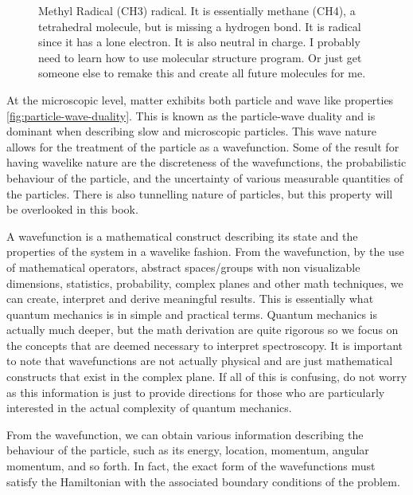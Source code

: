 \documentclass[11pt,a4paper]{book}
\newcommand{\imginput}[1]{} %
\begin{document}
	\begin{figure} [!ht]
		\centering
		\Large
		\def\svgwidth{\columnwidth}
		\resizebox{12cm}{!}{\imginput{images/methyl-radical.pdf_tex}}
		\caption{{Methyl Radical (CH3) radical. It is essentially methane (CH4), a tetrahedral molecule, but is missing a hydrogen bond. It is radical since it has a lone electron. It is also neutral in charge. I probably need to learn how to use molecular structure program. Or just get someone else to remake this and create all future molecules for me.}}
		\label{fig:methyl-radical}
	\end{figure}
		
	At the microscopic level, matter exhibits both particle and wave like properties \autoref{fig:particle-wave-duality}. This is known as the particle-wave duality and is dominant when describing slow and microscopic particles. This wave nature allows for the treatment of the particle as a wavefunction. Some of the result for having wavelike nature are the discreteness of the wavefunctions, the probabilistic behaviour of the particle, and the uncertainty of various measurable quantities of the particles. There is also tunnelling nature of particles, but this property will be overlooked in this book. 
	
	A wavefunction is a mathematical construct describing its state and the properties of the system in a wavelike fashion. From the wavefunction, by the use of mathematical operators, abstract spaces/groups with non visualizable dimensions, statistics, probability, complex planes and other math techniques, we can create, interpret and derive meaningful results. This is essentially what quantum mechanics is in simple and practical terms. Quantum mechanics is actually much deeper, but the math derivation are quite rigorous so we focus on the concepts that are deemed necessary to interpret spectroscopy. It is important to note that wavefunctions are not actually physical and are just mathematical constructs that exist in the complex plane. If all of this is confusing, do not worry as this information is just to provide directions for those who are particularly interested in the actual complexity of quantum mechanics.
		
	From the wavefunction, we can obtain various information describing the behaviour of the particle, such as its energy, location, momentum, angular momentum, and so forth. In fact, the exact form of the wavefunctions must satisfy the Hamiltonian with the associated boundary conditions of the problem.
	
\end{document}
